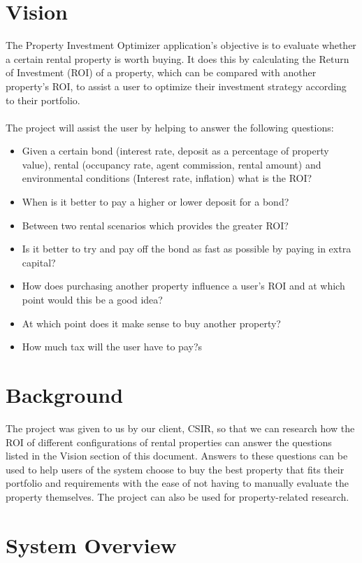 \documentclass[a4paper,12pt]{article}
\begin{document}
\section{Vision}
The Property Investment Optimizer application's objective is to evaluate whether a certain rental property is worth buying. It does this by calculating the Return of Investment (ROI) of a property, which can be compared with another property's ROI, to assist a user to optimize their investment strategy according to their portfolio.\\\\
The project will assist the user by helping to answer the following questions:\begin{itemize}
	\item Given a certain bond (interest rate, deposit as a percentage of property value), rental (occupancy rate, agent commission, rental amount) and environmental conditions (Interest rate, inflation) what is the ROI?
	\item When is it better to pay a higher or lower deposit for a bond?
	\item Between two rental scenarios which provides the greater ROI?
	\item Is it better to try and pay off the bond as fast as possible by paying in extra capital?
	\item How does purchasing another property influence a user's ROI and at which point would this be a good idea?
	\item At which point does it make sense to buy another property?
	\item How much tax will the user have to pay?s

\end{itemize}

\section{Background}
The project was given to us by our client, CSIR, so that we can research how the ROI of different configurations of rental properties can answer the questions listed in the Vision section of this document. Answers to these questions can be used to help users of the system choose to buy the best property that fits their portfolio and requirements with the ease of not having to manually evaluate the property themselves. The project can also be used for property-related research.


\section{System Overview}
\end{document}
